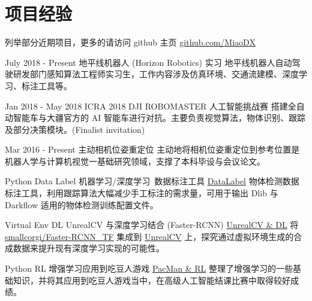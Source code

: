 \documentclass[utf8]{twentysecondcv} %
\begin{document}
\section{项目经验}
\begin{twenty}

    \twentyitem
        {}
        {}        
        {列举部分近期项目，更多的请访问 github 主页}
        {\href{https://github.com/MiaoDX/}{github.com/MiaoDX}}
        {}
        {}
    
        
    \twentyitem
    {July 2018 - }
    {Present}
    {地平线机器人 (Horizon Robotics) 实习}
    {}
    {}
    {地平线机器人自动驾驶研发部门感知算法工程师实习生，工作内容涉及仿真环境、交通流建模、深度学习、标注工具等。}
          
    \twentyitem
    {Jan 2018 - }
    {May 2018}
    {ICRA 2018 DJI ROBOMASTER 人工智能挑战赛}
    {}
    {}
    {搭建全自动智能车与大疆官方的 AI 智能车进行对抗。主要负责视觉算法，物体识别、跟踪及部分决策模块。(Finalist invitation)}
    
    \twentyitem
    {Mar 2016 -}
    {Present}
    {主动相机位姿重定位}
    {}
    {}
	{主动地将相机位姿重定位到参考位置是机器人学与计算机视觉一基础研究领域，支撑了本科毕设与会议论文。}
    
	\twentyitem
        {Python}
		{Data Label}
        {机器学习/深度学习\ 数据标注工具}
        {\href{https://github.com/MiaoDX/DataLabel}{DataLabel}}
        {}
        {物体检测数据标注工具，利用跟踪算法大幅减少手工标注的需求量，可用于输出 Dlib 与 Darkflow 适用的物体检测训练配置文件。}
          
    \twentyitem
        {Virtual Env}
      	{DL}
        {UnrealCV 与深度学习结合 (Faster-RCNN)}
        {\href{https://github.com/MiaoDX/unrealcv_examples/}{UnrealCV \& DL}}
        {}
        {将 \href{https://github.com/smallcorgi/Faster-RCNN\_TF}{smallcorgi/Faster-RCNN\_TF} 集成到 \href{https://github.com/unrealcv/unrealcv}{UnrealCV} 上，探究通过虚拟环境生成的合成数据来提升现有深度学习实现的可能性。}
                 
    \twentyitem
        {Python}
		{RL}
        {增强学习应用到吃豆人游戏}
        {\href{https://github.com/MiaoDX/hand_in_homework/tree/master/Advanced\_AI/}{PacMan \& RL}}
        {}
        {整理了增强学习的一些基础知识，并将其应用到吃豆人游戏当中，在高级人工智能结课比赛中取得较好成绩。}
        

\end{twenty}
\end{document}
